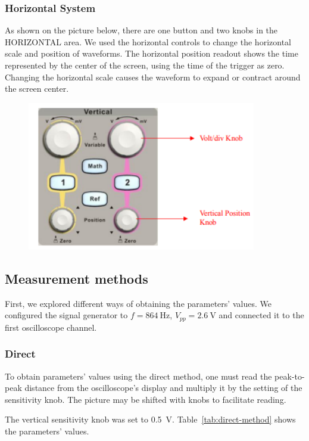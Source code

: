 \subsubsection*{Horizontal System}
As shown on the picture below, there are one button and two knobs in the HORIZONTAL area.
We used the horizontal controls to change the horizontal scale and position of
waveforms. The horizontal position readout shows the time represented by the
center of the screen, using the time of the trigger as zero. Changing the horizontal
scale causes the waveform to expand or contract around the screen center.

\begin{figure}[H]
	\centering
	\includegraphics[width=10cm]{images/18.png}
	\label{fig:wow9}
\end{figure}

\subsection{Measurement methods}

First, we explored different ways of obtaining the parameters' values. We configured the signal generator to $f = \SI{864}{\hertz}$, $V_{pp} = \SI{2.6}{\volt}$ and connected it to the first oscilloscope channel.

\subsubsection*{Direct}

 To obtain parameters' values using the direct method, one must read the peak-to-peak distance from the oscilloscope's display and multiply it by the setting of the sensitivity knob. The picture may be shifted with knobs to facilitate reading.

The vertical sensitivity knob was set to \SI{0.5}{\volt}. Table~\ref{tab:direct-method} shows the parameters' values.

